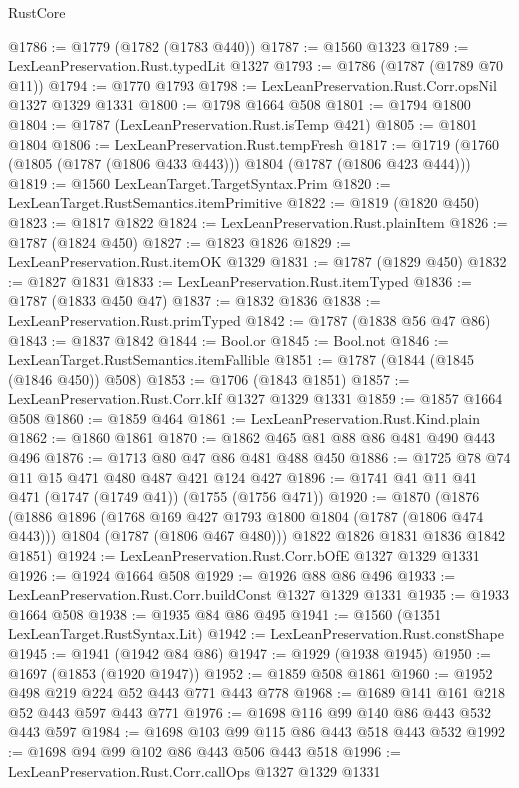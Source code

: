 \begin{lexlean}{RustCore}
\begin{coremodule}
@1786 := @1779 (@1782 (@1783 @440))
@1787 := @1560 @1323
@1789 := LexLeanPreservation.Rust.typedLit @1327
@1793 := @1786 (@1787 (@1789 @70 @11))
@1794 := @1770 @1793
@1798 := LexLeanPreservation.Rust.Corr.opsNil @1327 @1329 @1331
@1800 := @1798 @1664 @508
@1801 := @1794 @1800
@1804 := @1787 (LexLeanPreservation.Rust.isTemp @421)
@1805 := @1801 @1804
@1806 := LexLeanPreservation.Rust.tempFresh
@1817 := @1719 (@1760 (@1805 (@1787 (@1806 @433 @443))) @1804 (@1787 (@1806 @423 @444)))
@1819 := @1560 LexLeanTarget.TargetSyntax.Prim
@1820 := LexLeanTarget.RustSemantics.itemPrimitive
@1822 := @1819 (@1820 @450)
@1823 := @1817 @1822
@1824 := LexLeanPreservation.Rust.plainItem
@1826 := @1787 (@1824 @450)
@1827 := @1823 @1826
@1829 := LexLeanPreservation.Rust.itemOK @1329
@1831 := @1787 (@1829 @450)
@1832 := @1827 @1831
@1833 := LexLeanPreservation.Rust.itemTyped
@1836 := @1787 (@1833 @450 @47)
@1837 := @1832 @1836
@1838 := LexLeanPreservation.Rust.primTyped
@1842 := @1787 (@1838 @56 @47 @86)
@1843 := @1837 @1842
@1844 := Bool.or
@1845 := Bool.not
@1846 := LexLeanTarget.RustSemantics.itemFallible
@1851 := @1787 (@1844 (@1845 (@1846 @450)) @508)
@1853 := @1706 (@1843 @1851)
@1857 := LexLeanPreservation.Rust.Corr.kIf @1327 @1329 @1331
@1859 := @1857 @1664 @508
@1860 := @1859 @464
@1861 := LexLeanPreservation.Rust.Kind.plain
@1862 := @1860 @1861
@1870 := @1862 @465 @81 @88 @86 @481 @490 @443 @496
@1876 := @1713 @80 @47 @86 @481 @488 @450
@1886 := @1725 @78 @74 @11 @15 @471 @480 @487 @421 @124 @427
@1896 := @1741 @41 @11 @41 @471 (@1747 (@1749 @41)) (@1755 (@1756 @471))
@1920 := @1870
    (@1876
      (@1886
        @1896
        (@1768 @169 @427 @1793 @1800 @1804 (@1787 (@1806 @474 @443)))
        @1804
        (@1787 (@1806 @467 @480)))
      @1822
      @1826
      @1831
      @1836
      @1842
      @1851)
@1924 := LexLeanPreservation.Rust.Corr.bOfE @1327 @1329 @1331
@1926 := @1924 @1664 @508
@1929 := @1926 @88 @86 @496
@1933 := LexLeanPreservation.Rust.Corr.buildConst @1327 @1329 @1331
@1935 := @1933 @1664 @508
@1938 := @1935 @84 @86 @495
@1941 := @1560 (@1351 LexLeanTarget.RustSyntax.Lit)
@1942 := LexLeanPreservation.Rust.constShape
@1945 := @1941 (@1942 @84 @86)
@1947 := @1929 (@1938 @1945)
@1950 := @1697 (@1853 (@1920 @1947))
@1952 := @1859 @508 @1861
@1960 := @1952 @498 @219 @224 @52 @443 @771 @443 @778
@1968 := @1689 @141 @161 @218 @52 @443 @597 @443 @771
@1976 := @1698 @116 @99 @140 @86 @443 @532 @443 @597
@1984 := @1698 @103 @99 @115 @86 @443 @518 @443 @532
@1992 := @1698 @94 @99 @102 @86 @443 @506 @443 @518
@1996 := LexLeanPreservation.Rust.Corr.callOps @1327 @1329 @1331

\end{coremodule}
\end{lexlean}

